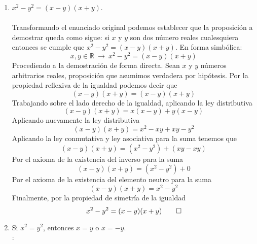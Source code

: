 \begin{enumerate}
\begin{enumerate}[label=\roman*.]
        \item $ x^2 - y^2 = (x-y)(x+y) $. \\
        \solucion \\
        Transformando el enunciado original podemos establecer que la proposición a demostrar queda como sigue: si $x$ y $y$ son dos número reales cualesquiera entonces se cumple que $ x^2 - y^2 = (x-y)(x+y) $. En forma simbólica:
        \begin{displaymath}
            x,y \in \mathbb{R} \ \longrightarrow \ x^2 - y^2 = (x-y)(x+y)
        \end{displaymath}
        Procediendo a la demostración de forma directa. Sean $x$ y $y$ números arbitrarios reales, proposición que asumimos verdadera por hipótesis. Por la propiedad reflexiva de la igualdad podemos decir que
        \begin{displaymath}
            (x-y)(x+y) = (x-y)(x+y)
        \end{displaymath}
        Trabajando sobre el lado derecho de la igualdad, aplicando la ley distributiva
        \begin{displaymath}
            (x-y)(x+y) = x(x-y) + y(x-y)
        \end{displaymath}
        Aplicando nuevamente la ley distributiva
        \begin{displaymath}
            (x-y)(x+y) = x^2 - xy + xy - y^2
        \end{displaymath}
        Aplicando la ley conmutativa y ley asociativa para la suma tenemos que
        \begin{displaymath}
            (x-y)(x+y) = (x^2 - y^2) + (xy-xy)
        \end{displaymath}
        Por el axioma de la existencia del inverso para la suma
        \begin{displaymath}
            (x-y)(x+y) = (x^2 - y^2) + 0
        \end{displaymath}
        Por el axioma de la existencia del elemento neutro para la suma
        \begin{displaymath}
            (x-y)(x+y) = x^2 - y^2
        \end{displaymath}
        Finalmente, por la propiedad de simetría de la igualdad
        \begin{displaymath}
            x^2 - y^2 = (x-y)(x+y) \qed
        \end{displaymath}
        
        \item Si $ x^2 = y^2 $, entonces $ x = y $ o $ x = -y $. \\
        \solucion: \\
        

\end{enumerate}
\end{enumerate}
